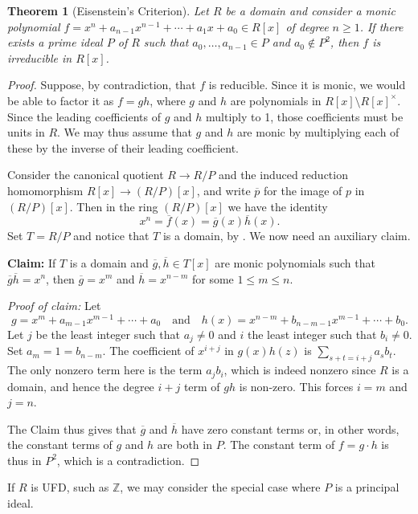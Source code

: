 \documentclass[12pt]{report}
\newtheorem{theorem}{Theorem}[chapter]
\numberwithin{equation}{section}
\numberwithin{theorem}{chapter}
\theoremstyle{definition}
\newtheorem*{basic properties}{Basic Properties}
\newtheorem*{Important Remark}{Important Remark}
\newcommand{\Z}{\mathbb{Z}}
\begin{document}
\begin{theorem}[Eisenstein's Criterion]  
Let $R$ be a domain and consider a monic polynomial $f = x^n + a_{n-1} x^{n-1} + \cdots + a_1 x + a_0 \in R[x]$ of degree $n \geqslant 1$. If there exists a prime ideal $P$ of $R$ such that $a_0, \dots, a_{n-1} \in P$ and $a_0 \notin P^2$, then $f$ is irreducible in $R[x]$.
\end{theorem}

\begin{proof} 
Suppose, by contradiction, that $f$ is reducible. Since it is monic, we would be able to factor it as $f = gh$, where $g$ and $h$ are polynomials in $R[x]\setminus R[x]^\times$. Since the leading coefficients of $g$ and $h$ multiply to 1, those coefficients must be units in $R$. We may thus assume that $g$ and $h$ are monic by multiplying each of these by the inverse of their leading coefficient.

Consider the canonical quotient $R \to R/P$ and the induced reduction homomorphism $R[x] \to (R/P)[x]$, and write $\overline{p}$ for the image of $p$ in $(R/P)[x]$. Then in the ring $(R/P)[x]$ we have the identity 
$$x^n = \overline{f}(x) = \overline{g}(x)\overline{h}(x).$$ 
Set $T=R/P$ and notice that $T$ is a domain, by . We now need an auxiliary claim.

{\bf Claim:} If $T$ is a domain and $\overline{g}, \overline{h} \in T[x]$ are monic polynomials such that $\overline{g} \overline{h} = x^n$, then $\overline{g} = x^m$ and $\overline{h} = x^{n-m}$ for some $1 \leqslant m \leqslant n$.

{\em Proof of claim:}  Let 
$$g = x^m + a_{m-1} x^{m-1} + \cdots + a_0 \quad \text{and} \quad h(x) = x^{n-m} + b_{n-m-1} x^{m-1} + \cdots +  b_0.$$ 
Let $j$ be the least integer such that $a_j \neq 0$ and $i$ the least integer such that $b_i \neq 0$. Set $a_m =1 = b_{n-m}$.
The coefficient of $x^{i+j}$ in $g(x) h(z)$ is $\sum_{s + t = i +j} a_s b_t$. The only nonzero term here is the term $a_j b_i$, which is indeed nonzero since $R$ is a domain, and hence the degree $i+j$ term of $g h$ is non-zero. This forces $i = m$ and  $j = n$.

The Claim thus gives that $\overline{g}$ and $\overline{h}$ have zero constant terms or, in other words, the constant terms of $g$ and $h$ are both in $P$. The constant term of $f = g \cdot h$ is thus in $P^2$, which is a contradiction.
\end{proof}


If $R$ is UFD, such as $\Z$, we may consider the special case where $P$ is a principal ideal.
\end{document}
